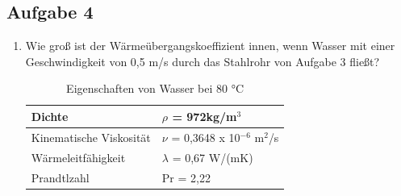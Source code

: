 \documentclass[a4paper,11pt]{article}
\begin{document}
\subsection*{Aufgabe 4}
\begin{enumerate}[label=\alph*)]
\item Wie groß ist der Wärmeübergangskoeffizient innen, wenn Wasser mit einer
Geschwindigkeit von 0,5 m/s durch das Stahlrohr von Aufgabe 3 fließt?

\begin{table}[h]
\centering
\caption{Eigenschaften von Wasser bei 80 °C}
\begin{tabular}{l|l}\rowcolor{miugray!50}
Dichte & $\rho$ = 972kg/m$^3$ \\ \hline
Kinematische Viskosität & $\nu$  = 0,3648 x 10$^{-6}$ m$^{2}$/s \\ \hline
Wärmeleitfähigkeit & $\lambda$ = 0,67 W/(mK) \\ \hline
Prandtlzahl & Pr = 2,22  \\ \hline
\end{tabular}
\end{table}


\end{enumerate}
\end{document}

